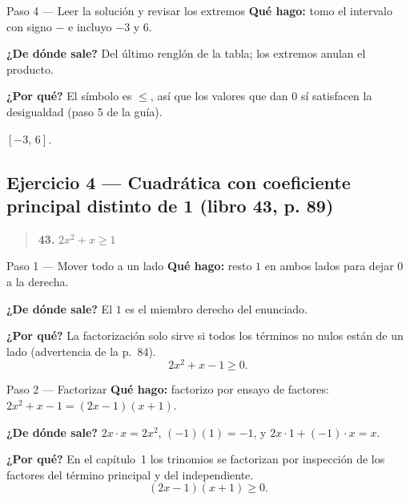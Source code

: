 \documentclass[11pt]{article}
\begin{document}
\begin{paso}{Paso 4 --- Leer la solución y revisar los extremos}
\textbf{Qué hago:} tomo el intervalo con signo $-$ e incluyo $-3$ y $6$.

\textbf{¿De dónde sale?} Del último renglón de la tabla; los extremos anulan el producto.

\textbf{¿Por qué?} El símbolo es $\le$, así que los valores que dan $0$ sí satisfacen la desigualdad (paso 5 de la guía).
\end{paso}

\begin{center}
\end{center}

\begin{resp}
$[-3,\,6]$.
\end{resp}

\subsection*{Ejercicio 4 --- Cuadrática con coeficiente principal distinto de 1 (libro 43, p. 89)}

\begin{quote}
\textbf{43.} $2x^2+x\ge 1$
\end{quote}

\begin{paso}{Paso 1 --- Mover todo a un lado}
\textbf{Qué hago:} resto $1$ en ambos lados para dejar $0$ a la derecha.

\textbf{¿De dónde sale?} El $1$ es el miembro derecho del enunciado.

\textbf{¿Por qué?} La factorización solo sirve si todos los términos no nulos están de un lado (advertencia de la p.~84).
\[
2x^2+x-1\ge 0.
\]
\end{paso}

\begin{paso}{Paso 2 --- Factorizar}
\textbf{Qué hago:} factorizo por ensayo de factores: $2x^2+x-1=(2x-1)(x+1)$.

\textbf{¿De dónde sale?} $2x\cdot x=2x^2$, $(-1)(1)=-1$, y $2x\cdot 1+(-1)\cdot x=x$.

\textbf{¿Por qué?} En el capítulo~1 los trinomios se factorizan por inspección de los factores del término principal y del independiente.
\[
(2x-1)(x+1)\ge 0.
\]
\end{paso}
\end{document}
